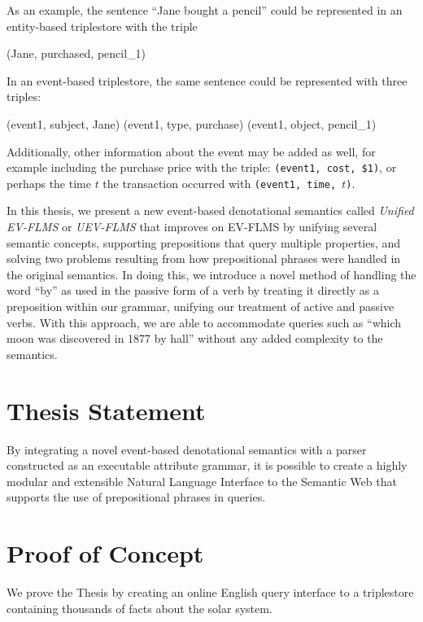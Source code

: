 \documentclass[../main.tex]{subfiles}
\begin{document}
As an example, the sentence ``Jane bought a pencil'' could be represented in an entity-based triplestore with the triple


\begin{code}
	(Jane, purchased, pencil_1)
\end{code}

In an event-based triplestore, the same sentence could be represented with three triples:

\begin{code}
	(event1, subject, Jane)
	(event1, type, purchase)
	(event1, object, pencil_1)
\end{code}
	
Additionally, other information about the event may be added as well, for example including the purchase price with the triple: \texttt{(event1, cost, \$1)}, or perhaps the time $t$ the transaction occurred with \texttt{(event1, time, $t$)}.

In this thesis, we present a new event-based denotational semantics called {\em Unified EV-FLMS} or {\em UEV-FLMS} that improves on EV-FLMS by unifying several semantic concepts,
supporting prepositions that query multiple properties, and solving two problems resulting from how prepositional phrases were handled in the original semantics.
In doing this, we introduce a novel method of handling the word ``by'' as used in the passive form of a verb by treating it directly as a preposition within our grammar, unifying our treatment of active and passive verbs.  With this approach, we are able to accommodate queries such as ``which moon was discovered in 1877 by hall'' without any added complexity to the semantics.

\section{Thesis Statement}
By integrating a novel event-based denotational semantics with a parser constructed as an executable attribute grammar, it is possible to create a highly modular and extensible Natural Language Interface to the Semantic Web that supports the use of prepositional phrases in queries.

\section{Proof of Concept} We prove the Thesis by creating an online English query interface to a triplestore containing thousands of facts about the solar system\cite{Solarman:2016}.
\end{document}
